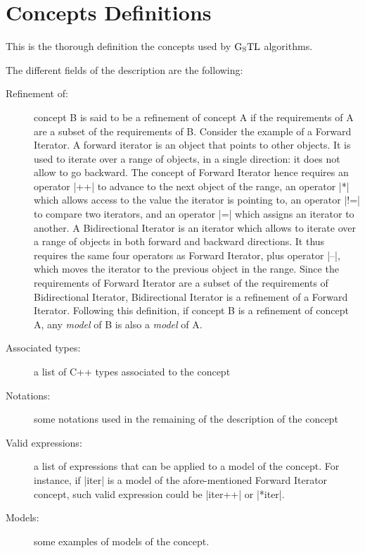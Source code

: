 \documentclass[12pt,twoside]{report}
\newcommand{\cpp}{C++}
\newcommand{\gtl}{$\rm{G_STL}$}
\begin{document}
\chapter{Concepts Definitions}
\label{definition}

This is the thorough definition the concepts used by \gtl{} algorithms.

\vspace{0.5cm}

The different fields of the description are the following:
\begin{description}
\item[Refinement of:] concept B is said to be a refinement of concept A if the requirements of A are a subset of the requirements of B. Consider the example of a Forward Iterator. A forward iterator is an object that points to other objects. It is used to iterate over a range of objects, in a single direction: it does not allow to go backward. The concept of Forward Iterator hence requires an operator |++| to advance to the next object of the range, an operator |*| which allows access to the value the iterator is pointing to, an operator |!=| to compare two iterators, and an operator |=| which assigns an iterator to another. A Bidirectional Iterator is an iterator which allows to iterate over a range of objects in both forward and backward directions. It thus requires the same four operators as Forward Iterator, plus operator |--|, which moves the iterator to the previous object in the range. Since the requirements of Forward Iterator are a subset of the requirements of Bidirectional Iterator, Bidirectional Iterator is a refinement of a Forward Iterator.
Following this definition, if concept B is a refinement of concept A, any \emph{model} of B is also a \emph{model} of A.

\item[Associated types:] a list of \cpp{} types associated to the concept

\item[Notations:] some notations used in the remaining of the description of the concept

\item[Valid expressions:]  a list of expressions that can be applied to a model of the concept. For instance, if |iter| is a model of the afore-mentioned Forward Iterator concept, such valid expression could be |iter++| or |*iter|.

\item[Models:] some examples of models of the concept. 
\end{description}
\end{document}
